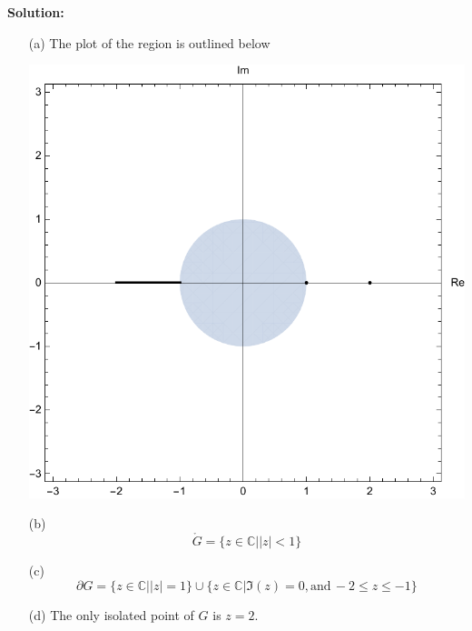 \documentclass[12pt,oneside]{exam}
\begin{document}
\vspace{0.5cm}

\noindent \textbf{Solution:}
\begin{itemize}
\item[(a)] The plot of the region is outlined below

\begin{center}
\includegraphics[scale=0.5]{p1.pdf}
\end{center}


\item[(b)] 
\begin{equation*}
\mathring{G} = \{z \in \mathbb{C} | |z|<1\}
\end{equation*}
\item[(c)] 
\begin{equation*}
\partial G = \{z \in \mathbb{C} | |z| =1\} \cup \{ z \in \mathbb{C} | \Im(z) =0, \mbox{and} \, -2 \leq z \leq -1\}
\end{equation*}
\item[(d)] The only isolated point of $G$ is $z=2$.
\end{itemize}

\vspace{1cm}
\end{document}
